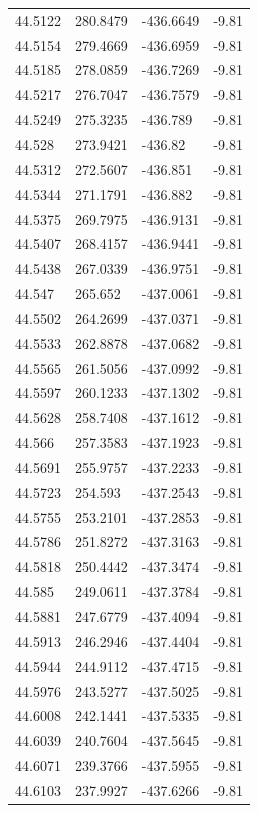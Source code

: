 \begin{table}[H]
\begin{tabular}{llll}
44.5122 & 280.8479 & -436.6649 & -9.81 \\
44.5154 & 279.4669 & -436.6959 & -9.81 \\
44.5185 & 278.0859 & -436.7269 & -9.81 \\
44.5217 & 276.7047 & -436.7579 & -9.81 \\
44.5249 & 275.3235 & -436.789 & -9.81 \\
44.528 & 273.9421 & -436.82 & -9.81 \\
44.5312 & 272.5607 & -436.851 & -9.81 \\
44.5344 & 271.1791 & -436.882 & -9.81 \\
44.5375 & 269.7975 & -436.9131 & -9.81 \\
44.5407 & 268.4157 & -436.9441 & -9.81 \\
44.5438 & 267.0339 & -436.9751 & -9.81 \\
44.547 & 265.652 & -437.0061 & -9.81 \\
44.5502 & 264.2699 & -437.0371 & -9.81 \\
44.5533 & 262.8878 & -437.0682 & -9.81 \\
44.5565 & 261.5056 & -437.0992 & -9.81 \\
44.5597 & 260.1233 & -437.1302 & -9.81 \\
44.5628 & 258.7408 & -437.1612 & -9.81 \\
44.566 & 257.3583 & -437.1923 & -9.81 \\
44.5691 & 255.9757 & -437.2233 & -9.81 \\
44.5723 & 254.593 & -437.2543 & -9.81 \\
44.5755 & 253.2101 & -437.2853 & -9.81 \\
44.5786 & 251.8272 & -437.3163 & -9.81 \\
44.5818 & 250.4442 & -437.3474 & -9.81 \\
44.585 & 249.0611 & -437.3784 & -9.81 \\
44.5881 & 247.6779 & -437.4094 & -9.81 \\
44.5913 & 246.2946 & -437.4404 & -9.81 \\
44.5944 & 244.9112 & -437.4715 & -9.81 \\
44.5976 & 243.5277 & -437.5025 & -9.81 \\
44.6008 & 242.1441 & -437.5335 & -9.81 \\
44.6039 & 240.7604 & -437.5645 & -9.81 \\
44.6071 & 239.3766 & -437.5955 & -9.81 \\
44.6103 & 237.9927 & -437.6266 & -9.81 \\

\end{tabular}
\end{table}
